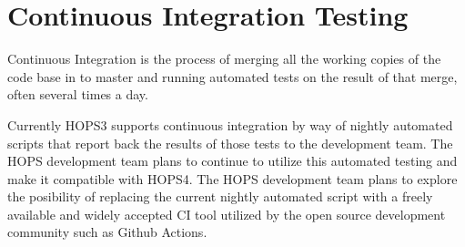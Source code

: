 %
%
\section{Continuous Integration Testing}
\label{sec:integration}

Continuous Integration is the process of merging all the working copies of the code
base in to master and running automated tests on the result of that merge, often 
several times a day.

Currently HOPS3 supports continuous integration by way of nightly automated scripts 
that report back the results of those tests to the development team.
The HOPS development team plans to continue to utilize this automated testing
and make it compatible with HOPS4. The HOPS development team plans to explore the posibility
of replacing the current nightly automated script with a freely available and widely
accepted CI tool utilized by the open source development community such as Github Actions. 


%
%
